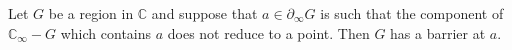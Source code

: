 Let $G$ be a region in $\mathbb{C}$ and suppose that $a \in \partial_\infty G$ is such that the component of $\mathbb{C}_\infty - G$ which contains $a$ does not reduce to a point. Then $G$ has a barrier at $a$.

